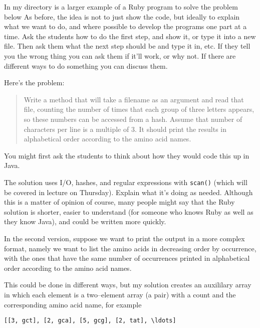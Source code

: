 \documentclass[12pt]{article}
\begin{document}
        In my directory is a larger example of a Ruby program to solve the
      problem below As before, the idea is not to just show the code, but
      ideally to explain what we want to do, and where possible to develop
      the programs one part at a time.  Ask the students how to do the first
      step, and show it, or type it into a new file.  Then ask them what the
      next step should be and type it in, etc.  If they tell you the wrong
      thing you can ask them if it'll work, or why not.  If there are
      different ways to do something you can discuss them.
  
        Here's the problem:
  
        \begin{quote}
  
          Write a method that will take a filename as an argument and read
          that file, counting the number of times that each group of three
          letters appears, so these numbers can be accessed from a hash.
          Assume that number of characters per line is a multiple of 3.  It
          should print the results in alphabetical order according to the
          amino acid names.
  
        \end{quote}
  
        You might first ask the students to think about how they would code
      this up in Java.
  
        The solution uses I/O, hashes, and regular expressions with
      \texttt{scan()} (which will be covered in lecture on Thursday).
      Explain what it's doing as needed.  Although this is a matter of
      opinion of course, many people might say that the Ruby solution is
      shorter, easier to understand (for someone who knows Ruby as well as
      they know Java), and could be written more quickly.
  
        In the second version, suppose we want to print the output in a more
      complex format, namely we want to list the amino acids in decreasing
      order by occurrence, with the ones that have the same number of
      occurrences printed in alphabetical order according to the amino acid
      names.
  
        This could be done in different ways, but my solution creates an
      auxililary array in which each element is a two--element array (a
      pair) with a count and the corresponding amino acid name, for example
  
        \begin{centering}
  
          \begin{BVerbatim}[commandchars=\\\<\>]
          [[3, gct], [2, gca], [5, gcg], [2, tat], \ldots]
          \end{BVerbatim}
  
        \end{centering}
  
\end{document}
